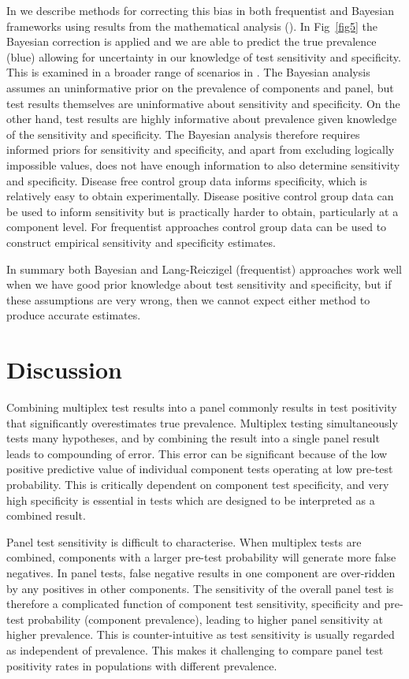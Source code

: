\documentclass[10pt,letterpaper]{article}
\begin{document}
In  we describe methods for correcting this bias in both frequentist and Bayesian frameworks using results from the mathematical analysis (). In Fig~\ref{fig5} the Bayesian correction is applied and we are able to predict the true prevalence (blue) allowing for uncertainty in our knowledge of test sensitivity and specificity. This is examined in a broader range of scenarios in . The Bayesian analysis assumes an uninformative prior on the prevalence of components and panel, but test results themselves are uninformative about sensitivity and specificity. On the other hand, test results are highly informative about prevalence given knowledge of the sensitivity and specificity. The Bayesian analysis therefore requires informed priors for sensitivity and specificity, and apart from excluding logically impossible values, does not have enough information to also determine sensitivity and specificity. Disease free control group data informs specificity, which is relatively easy to obtain experimentally. Disease positive control group data can be used to inform sensitivity but is practically harder to obtain, particularly at a component level. For frequentist approaches control group data can be used to construct empirical sensitivity and specificity estimates.

In summary both Bayesian and Lang-Reiczigel (frequentist) approaches work well when we have good prior knowledge about test sensitivity and specificity, but if these assumptions are very wrong, then we cannot expect either method to produce accurate estimates.

\section*{Discussion}

Combining multiplex test results into a panel commonly results in test positivity that significantly overestimates true prevalence. Multiplex testing simultaneously tests many hypotheses, and by combining the result into a single panel result leads to compounding of error. This error can be significant because of the low positive predictive value of individual component tests operating at low pre-test probability. This is critically dependent on component test specificity, and very high specificity is essential in tests which are designed to be interpreted as a combined result.

Panel test sensitivity is difficult to characterise. When multiplex tests are combined, components with a larger pre-test probability will generate more false negatives. In panel tests, false negative results in one component are over-ridden by any positives in other components. The sensitivity of the overall panel test is therefore a complicated function of component test sensitivity, specificity and pre-test probability (component prevalence), leading to higher panel sensitivity at higher prevalence. This is counter-intuitive as test sensitivity is usually regarded as independent of prevalence. This makes it challenging to compare panel test positivity rates in populations with different prevalence.
\end{document}
